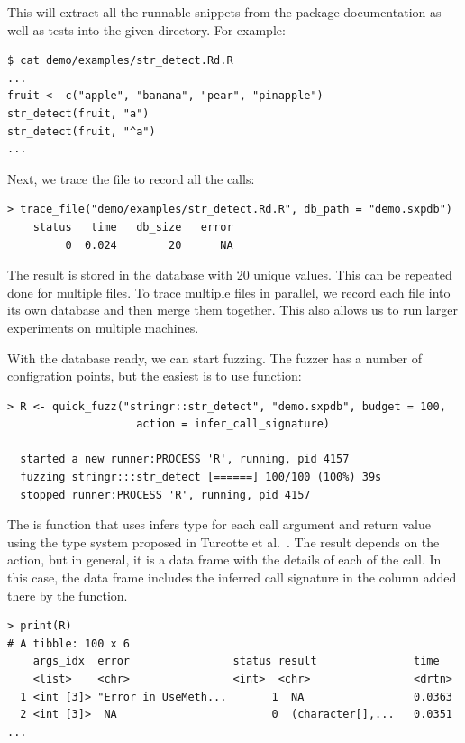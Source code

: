 \documentclass[sigplan,nonacm,anonymous,review]{acmart}
\begin{document}
This will extract all the runnable snippets from the package documentation as
well as tests into the given directory.
For example:

\begin{lstlisting}
$ cat demo/examples/str_detect.Rd.R
...
fruit <- c("apple", "banana", "pear", "pinapple")
str_detect(fruit, "a")
str_detect(fruit, "^a")
...
\end{lstlisting}

Next, we trace the file to record all the calls:

\begin{lstlisting}
> trace_file("demo/examples/str_detect.Rd.R", db_path = "demo.sxpdb")
    status   time   db_size   error
         0  0.024        20      NA
\end{lstlisting}

The result is stored in the  database with 20 unique values.
This can be repeated done for multiple files.
To trace multiple files in parallel, we record each file into its own database and then merge them together.
This also allows us to run larger experiments on multiple machines.

With the database ready, we can start fuzzing.
The fuzzer has a number of configration points, but the easiest is to use  function:

\begin{lstlisting}
> R <- quick_fuzz("stringr::str_detect", "demo.sxpdb", budget = 100, 
                    action = infer_call_signature)

  started a new runner:PROCESS 'R', running, pid 4157
  fuzzing stringr:::str_detect [======] 100/100 (100%) 39s
  stopped runner:PROCESS 'R', running, pid 4157
\end{lstlisting}

The  is \tool function that uses infers type for each call argument and return value using the type system proposed in Turcotte et al.~\cite{turcotte2020designing}.
The result depends on the action, but in general, it is a data frame with the details of each of the call.
In this case, the data frame includes the inferred call signature in the  column added there by the  function.

\begin{lstlisting}
> print(R)
# A tibble: 100 x 6
    args_idx  error                status result               time
    <list>    <chr>                <int>  <chr>                <drtn>
  1 <int [3]> "Error in UseMeth...       1  NA                 0.0363
  2 <int [3]>  NA                        0  (character[],...   0.0351
...
\end{lstlisting}
\end{document}
